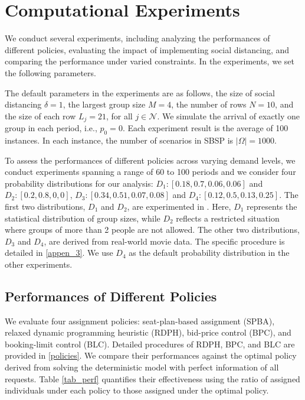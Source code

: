 \section{Computational Experiments}\label{sec_result}
We conduct several experiments, including analyzing the performances of different policies, evaluating the impact of implementing social distancing, and comparing the performance under varied constraints.
In the experiments, we set the following parameters. 

The default parameters in the experiments are as follows, the size of social distancing $\delta =1$, the largest group size $M =4$, the number of rows $N = 10$, and the size of each row $L_j = 21$, for all $j \in \mathcal{N}$. We simulate the arrival of exactly one group in each period, i.e., $p_0 = 0$. Each experiment result is the average of 100 instances. In each instance, the number of scenarios in SBSP is $|\Omega| = 1000$.

To assess the performances of different policies across varying demand levels, we conduct experiments spanning a range of 60 to 100 periods and we consider four probability distributions for our analysis: $D_1:[0.18,0.7,0.06,0.06]$ and $D_2:[0.2,0.8,0,0]$, $D_3: [0.34, 0.51, 0.07, 0.08]$ and $D_4: [0.12, 0.5, 0.13, 0.25]$. The first two distributions, $D_1$ and $D_2$, are experimented in \cite{blom2022filling}. Here, $D_1$ represents the statistical distribution of group sizes, while $D_2$ reflects a restricted situation where groups of more than 2 people are not allowed. The other two distributions, $D_3$ and $D_4$, are derived from real-world movie data. The specific procedure is detailed in \ref{appen_3}. We use $D_4$ as the default probability distribution in the other experiments.


\subsection{Performances of Different Policies}
We evaluate four assignment policies: seat-plan-based assignment (SPBA), relaxed dynamic programming heuristic (RDPH), bid-price control (BPC), and booking-limit control (BLC). Detailed procedures of RDPH, BPC, and BLC are provided in \ref{policies}. 
We compare their performances against the optimal policy derived from solving the deterministic model with perfect information of all requests. Table \ref{tab_perf} quantifies their effectiveness using the ratio of assigned individuals under each policy to those assigned under the optimal policy.


